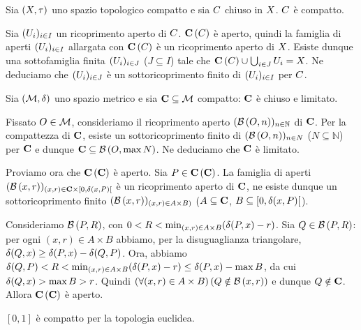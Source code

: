 \begin{Theorem}
	Sia $(X,\tau)$ uno spazio topologico compatto e sia $C$ chiuso in $X$. $C$ \`e compatto.
\end{Theorem}
\Proof Sia $(U_i)_{i \in I}$ un ricoprimento aperto di $C$. $\mathbf{C} \left ( C \right )$ \`e aperto, quindi la famiglia di aperti $(U_i)_{i \in I}$ allargata con $\mathbf{C} \left ( C \right )$ \`e un ricoprimento aperto di $X$. Esiste dunque una sottofamiglia finita $(U_i)_{i \in J}$ ($J \subseteq I$) tale che $\mathbf{C} \left ( C \right ) \cup \bigcup_{i \in J} U_i = X$. Ne deduciamo che $(U_i)_{i \in J}$ \`e un sottoricoprimento finito di $(U_i)_{i \in I}$ per $C$. \EndProof
\begin{Theorem}
	Sia $(\mathcal{M},\delta)$ uno spazio metrico e sia $\mathbf{C} \subseteq \mathcal{M}$ compatto: $\mathbf{C}$ \`e chiuso e limitato.
\end{Theorem}
\Proof Fissato $O \in \mathcal{M}$, consideriamo il ricoprimento aperto $(\mathcal{B}\left (O,n \right))_{n \in \mathbb{N}}$ di $\mathbf{C}$. Per la compattezza di $\mathbf{C}$, esiste un sottoricoprimento finito di $(\mathcal{B}\left (O,n \right))_{n \in N}$ ($N \subseteq \mathbb{N}$) per $\mathbf{C}$ e dunque $\mathbf{C} \subseteq \mathcal{B}\left (O,\max N \right)$. Ne deduciamo che $\mathbf{C}$ \`e limitato.
\par Proviamo ora che $\mathbf{C} \left ( \mathbf{C} \right )$ \`e aperto. Sia $P \in \mathbf{C} \left ( \mathbf{C} \right )$. La famiglia di aperti $(\mathcal{B}\left (x,r \right))_{(x,r) \in \mathbf{C} \times [0,\delta(x,P)[}$ \`e un ricoprimento aperto di $\mathbf{C}$, ne esiste dunque un sottoricoprimento finito $(\mathcal{B}\left (x,r \right))_{(x,r) \in A \times B)}$ ($A \subseteq \mathbf{C}$, $B \subseteq [0, \delta(x,P)[$).
\par Consideriamo $\mathcal{B}\left (P,R \right)$, con $0 < R < \min_{(x,r) \in A \times B} (\delta(P,x) - r)$. Sia $Q \in \mathcal{B}\left (P,R \right)$: per ogni $(x,r) \in A \times B$ abbiamo, per la disuguaglianza triangolare, $\delta(Q,x) \geq \delta(P,x) - \delta(Q,P)$. Ora, abbiamo $\delta(Q,P) < R < \min_{(x,r) \in A \times B} (\delta(P,x) - r) \leq \delta(P,x) - \max B$, da cui $\delta(Q,x) > \max B > r$. Quindi $\left ( \forall (x,r) \in A \times B \right ) \left ( Q \notin \mathcal{B}\left (x,r \right) \right )$ e dunque $Q \notin \mathbf{C}$. Allora $\mathbf{C} \left ( \mathbf{C} \right )$ \`e aperto. \EndProof
\begin{Theorem}
	$[0,1]$ \`e compatto per la topologia euclidea.
\end{Theorem}
